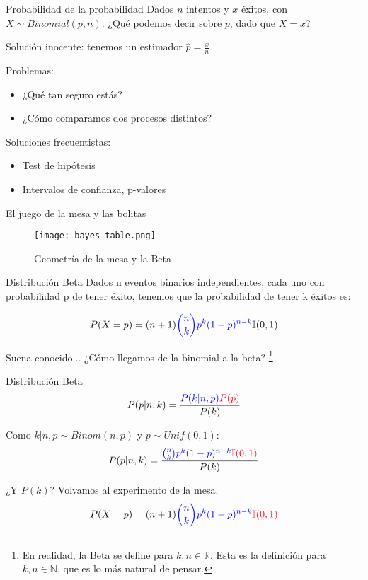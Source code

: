 \documentclass{beamer}
\begin{document}
\begin{frame}{Probabilidad de la probabilidad}
	Dados $n$ intentos y $x$ éxitos, con $X \sim Binomial(p, n)$.
	¿Qué podemos decir sobre $p$, dado que $X = x$?\pause

	Solución inocente: tenemos un estimador $\hat{p} = \frac{x}{n}$\pause

	Problemas:
	\begin{itemize}
		\item ¿Qué tan seguro estás?
		\item ¿Cómo comparamos dos procesos distintos?
	\end{itemize}

	Soluciones frecuentistas:
	\begin{itemize}
		\item Test de hipótesis
		\item Intervalos de confianza, p-valores
	\end{itemize}
\end{frame}

\begin{frame}{El juego de la mesa y las bolitas}
	\begin{figure}
		\centering
		\texttt{[image: bayes-table.png]}
		\caption{Geometría de la mesa y la Beta}
		\label{fig:bayes-table}
	\end{figure}
\end{frame}

\begin{frame}{Distribución Beta}
	Dados n eventos binarios independientes, cada uno con probabilidad p de tener éxito, tenemos que la probabilidad de tener k éxitos es:
	
	$$P(X=p) =
		(n+1)
		\textcolor{blue}{\binom{n}{k} p^k (1-p)^{n-k}}
		\mathbb{I}(0,1)$$

	Suena conocido... ¿Cómo llegamos de la binomial a la beta?
	\footnote{En realidad, la Beta se define para $k,n \in \mathbb{R}$. Esta es la definición para $k,n \in \mathbb{N}$, que es lo más natural de pensar.}
\end{frame}

\begin{frame}{Distribución Beta}
	$$P(p|n,k) = \frac{
		\textcolor{blue}{P(k|n,p)}
		\textcolor{red}{P(p)}
	}{
		P(k)
	}$$
	\pause

	Como $k|n,p \sim Binom(n, p)$ y $p \sim Unif(0, 1)$:
	$$P(p|n,k) = \frac{
			\textcolor{blue}{\binom{n}{k} p^k (1-p)^{n-k}}
			\textcolor{red}{\mathbb{I}(0,1)}
		}{
			P(k)
		}$$
	\pause

	¿Y $P(k)$? Volvamos al experimento de la mesa.
	\pause
	$$
		P(X=p) =
		(n+1)
		\textcolor{blue}{\binom{n}{k} p^k (1-p)^{n-k}}
		\textcolor{red}{\mathbb{I}(0,1)}
	$$
\end{frame}
\end{document}
